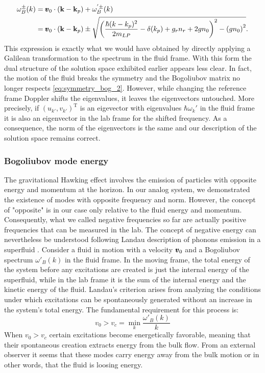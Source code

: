 \begin{equation}
    \begin{aligned}
    \omega^{\pm}_B(k)&=\pmb{v}_0\cdot(\mathbf{k}-\mathbf{k}_p)+\omega^{'\pm}_B(k) \\
            &=\pmb{v}_0\cdot(\mathbf{k}-\mathbf{k}_p)\pm\sqrt{\left(\dfrac{\hbar(k-k_p)^2}{2m_{LP}}-\delta(k_p)+ g_rn_r +2g n_0\right)^2 - \left(g n_0\right)^2}.
    \label{eq:bogo_lab_frame}
    \end{aligned}
\end{equation}
This expression is exactly what we would have obtained by directly applying a Galilean transformation to the spectrum in the fluid frame. With this form
the dual structure of the solution space exhibited earlier appears less clear. In fact, the motion of the fluid breaks the symmetry and the Bogoliubov matrix no longer respects \autoref{eq:symmetry_bog_2}. However, while changing the reference frame Doppler shifts the eigenvalues, it leaves the eigenvectors untouched. More precisely, if $(u_{k'},v_{k'})^{\mathrm{T}}$ is an eigevector with eigenvalues $\hbar\omega_k'$ in the fluid frame it is also an eigenvector 
in the lab frame for the shifted frequency. As a consequence, the norm of the eigenvectors is the same and our description of the solution space remains correct.

\subsubsection{Bogoliubov mode energy}
\label{subsub:bogo_energy}
The gravitational Hawking effect involves the emission of particles with opposite energy and momentum at the horizon. In our analog
system, we demonstrated the existence of modes with opposite frequency and norm. However, the concept of "opposite" is in our case only relative to the fluid energy and momentum. Consequently, what we
called negative frequencies so far are actually positive frequencies that can be measured in the lab. The concept of negative energy can nevertheless be understood following Landau description
 of phonons emission in a superfluid \cite{landau_superfluidity_1941}. Consider a fluid in motion with a velocity $\pmb{v}_0$ and a Bogoliubov spectrum $\omega'_B(k)$ in the fluid frame. 
In the moving frame, the total energy of the system before any excitations are created is just the internal energy of the superfluid, while in the lab frame it is the sum of the internal energy and the kinetic energy of the fluid.
Landau's criterion arises from analyzing the conditions under which excitations can be spontaneously generated without an increase in the system's total energy. The fundamental requirement for this process is:
\begin{equation}
    v_0>v_c = \min_k \dfrac{\omega'_B(k)}{k}
\end{equation}
When $v_0>v_c$ certain excitations become energetically favorable, meaning that their spontaneous creation extracts energy from the bulk flow. From
an external observer it seems that these modes carry energy away from the bulk motion or in other words, that the fluid is loosing energy. 

